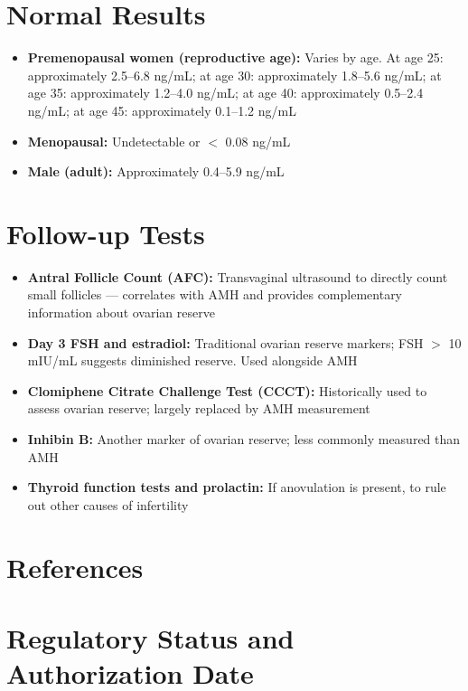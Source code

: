 \section*{Normal Results}
\begin{itemize}
  \item \textbf{Premenopausal women (reproductive age):} Varies by age. At age 25: approximately 2.5--6.8 ng/mL; at age 30: approximately 1.8--5.6 ng/mL; at age 35: approximately 1.2--4.0 ng/mL; at age 40: approximately 0.5--2.4 ng/mL; at age 45: approximately 0.1--1.2 ng/mL
  \item \textbf{Menopausal:} Undetectable or $<$ 0.08 ng/mL
  \item \textbf{Male (adult):} Approximately 0.4--5.9 ng/mL
\end{itemize}

\section*{Follow-up Tests}
\begin{itemize}
  \item \textbf{Antral Follicle Count (AFC):} Transvaginal ultrasound to directly count small follicles --- correlates with AMH and provides complementary information about ovarian reserve
  \item \textbf{Day 3 FSH and estradiol:} Traditional ovarian reserve markers; FSH $>$ 10 mIU/mL suggests diminished reserve. Used alongside AMH
  \item \textbf{Clomiphene Citrate Challenge Test (CCCT):} Historically used to assess ovarian reserve; largely replaced by AMH measurement
  \item \textbf{Inhibin B:} Another marker of ovarian reserve; less commonly measured than AMH
  \item \textbf{Thyroid function tests and prolactin:} If anovulation is present, to rule out other causes of infertility
\end{itemize}


\section*{References}



\clearpage
\section*{Regulatory Status and Authorization Date}

\clearpage

